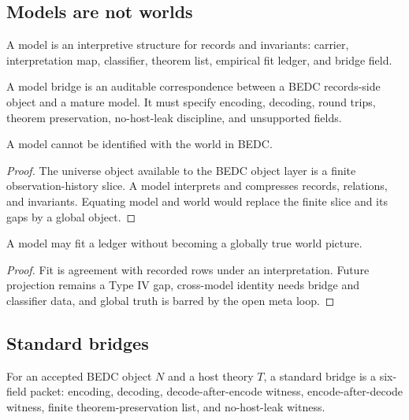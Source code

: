 \subsection{Models are not worlds}
\label{subsec:philosophy-models-not-worlds}

\begin{definition}[Model]
\label{def:philosophy-model}
A model is an interpretive structure for records and invariants:
carrier, interpretation map, classifier, theorem list, empirical fit
ledger, and bridge field.
\end{definition}

\begin{definition}
\label{def:philosophy-model-bridge}
A model bridge is an auditable correspondence between a BEDC
records-side object and a mature model. It must specify encoding,
decoding, round trips, theorem preservation, no-host-leak discipline,
and unsupported fields.
\end{definition}

\begin{theorem}
\label{thm:philosophy-models-not-worlds}
A model cannot be identified with the world in BEDC.
\end{theorem}
\begin{proof}
The universe object available to the BEDC object layer is a finite
observation-history slice. A model interprets and compresses records,
relations, and invariants. Equating model and world would replace the
finite slice and its gaps by a global object.
\end{proof}

\begin{corollary}
\label{cor:philosophy-model-fit-not-world-truth}
A model may fit a ledger without becoming a globally true world
picture.
\end{corollary}
\begin{proof}
Fit is agreement with recorded rows under an interpretation. Future
projection remains a Type IV gap, cross-model identity needs bridge and
classifier data, and global truth is barred by the open meta loop.
\end{proof}

\subsection{Standard bridges}
\label{subsec:philosophy-standard-bridges}

\begin{definition}
\label{def:philosophy-standard-bridge}
For an accepted BEDC object \(N\) and a host theory \(T\), a standard
bridge is a six-field packet:
encoding, decoding, decode-after-encode witness, encode-after-decode
witness, finite theorem-preservation list, and no-host-leak witness.
\end{definition}

